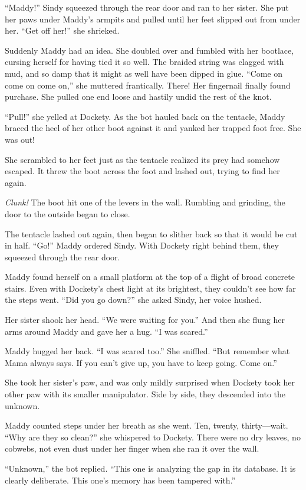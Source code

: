 \documentclass[10pt]{article}
\begin{document}
``Maddy!'' Sindy squeezed through the rear door and ran to her sister.
She put her paws under Maddy's armpits and pulled until her feet slipped
out from under her. ``Get off her!'' she shrieked.

Suddenly Maddy had an idea. She doubled over and fumbled with her
bootlace, cursing herself for having tied it so well. The braided string
was clagged with mud, and so damp that it might as well have been dipped
in glue. ``Come on come on come on,'' she muttered frantically. There!
Her fingernail finally found purchase. She pulled one end loose and
hastily undid the rest of the knot.

``Pull!'' she yelled at Dockety. As the bot hauled back on the tentacle,
Maddy braced the heel of her other boot against it and yanked her
trapped foot free. She was out!

She scrambled to her feet just as the tentacle realized its prey had
somehow escaped. It threw the boot across the foot and lashed out,
trying to find her again.

\emph{Clunk!} The boot hit one of the levers in the wall. Rumbling and
grinding, the door to the outside began to close.

The tentacle lashed out again, then began to slither back so that it
would be cut in half. ``Go!'' Maddy ordered Sindy. With Dockety right
behind them, they squeezed through the rear door.

Maddy found herself on a small platform at the top of a flight of broad
concrete stairs. Even with Dockety's chest light at its brightest, they
couldn't see how far the steps went. ``Did you go down?'' she asked
Sindy, her voice hushed.

Her sister shook her head. ``We were waiting for you.'' And then she
flung her arms around Maddy and gave her a hug. ``I was scared.''

Maddy hugged her back. ``I was scared too.'' She sniffled. ``But
remember what Mama always says. If you can't give up, you have to keep
going. Come on.''

She took her sister's paw, and was only mildly surprised when Dockety
took her other paw with its smaller manipulator. Side by side, they
descended into the unknown.

Maddy counted steps under her breath as she went. Ten, twenty,
thirty---wait. ``Why are they so clean?'' she whispered to Dockety.
There were no dry leaves, no cobwebs, not even dust under her finger
when she ran it over the wall.

``Unknown,'' the bot replied. ``This one is analyzing the gap in its
database. It is clearly deliberate. This one's memory has been tampered
with.''
\end{document}
